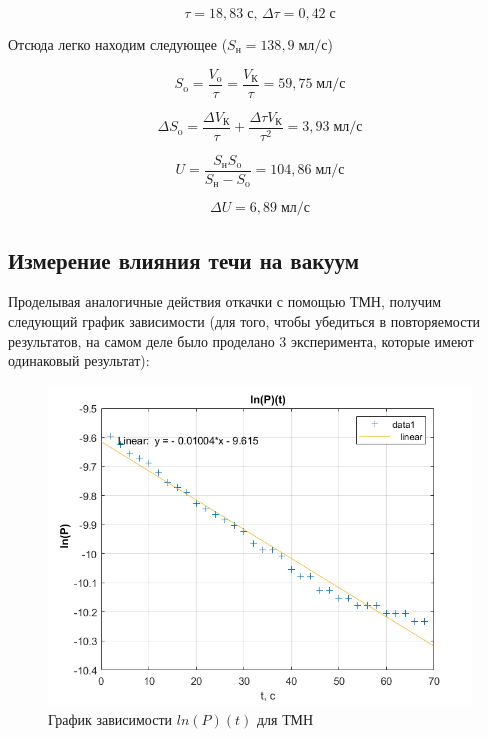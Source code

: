 \documentclass[a4paper, 12pt]{article} %
\begin{document}
\begin{equation}
	\tau = 18,83 \; \text{с, } \Delta \tau = 0,42 \; \text{с}
\end{equation}

Отсюда легко находим следующее ($S_{\text{н}} = 138,9 \; \text{мл/с}$)

\begin{equation}
	S_{\text{o}} = \frac{V_{\text{o}}}{\tau} = \frac{V_{\text{К}}}{\tau} = 59,75 \; \text{мл/с}
\end{equation}

\begin{equation}
	\Delta S_{\text{o}} = \frac{\Delta V_{\text{К}}}{\tau} + \frac{\Delta \tau V_{\text{К}}}{\tau^2} = 3,93 \; \text{мл/с}
\end{equation}

\begin{equation}
	U = \frac{S_{\text{н}} S_{\text{o}}}{S_{\text{н}} - S_{\text{o}}} = 104,86 \; \text{мл/с}
\end{equation}

\begin{equation}
	\Delta U = 6,89\; \text{мл/с}
\end{equation}


\subsection{Измерение влияния течи на вакуум}

Проделывая аналогичные действия откачки с помощью ТМН, получим следующий график зависимости (для того, чтобы убедиться в повторяемости результатов, на самом деле было проделано 3 эксперимента, которые имеют одинаковый результат):

\begin{figure}[h]
    \centering
    \includegraphics[width = 11 cm]{fig2}
    \caption{График зависимости $ln(P)(t)$ для ТМН}
    \label{fig:vac}
\end{figure}
\end{document}
